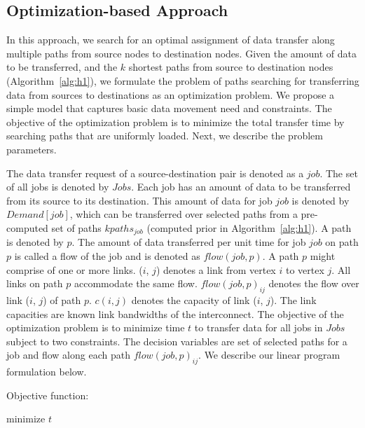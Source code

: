 \subsection{Optimization-based Approach}
\label{sec:optimization}

In this approach, we search for an optimal assignment of data transfer along multiple paths from source nodes to destination nodes. Given the amount of data to be transferred, and the $k$ shortest paths from source to destination nodes (Algorithm~\ref{alg:h1}), we formulate the problem of paths searching for transferring data from sources to destinations as an optimization problem. We propose a simple model that captures basic data movement need and constraints. The objective of the optimization problem is to minimize the total transfer time by searching paths that are uniformly loaded. Next, we describe the problem parameters.

The data transfer request of a source-destination pair is denoted as a $job$. The set of all jobs is denoted by $Jobs$. Each job has an amount of data to be transferred from its source to its destination. This amount of data for job $job$ is denoted by $Demand[job]$, which can be transferred over selected paths from a pre-computed set of paths $kpaths_{job}$ (computed prior in Algorithm~\ref{alg:h1}). A path is denoted by $p$. The amount of data transferred per unit time for job $job$ on path $p$ is called a flow of the job and is denoted as $flow(job, p)$. A path $p$ might comprise of one or more links. ($i$, $j$) denotes a link from vertex $i$ to vertex $j$. All links on path $p$ accommodate the same flow. $flow(job, p)_{ij}$ denotes the flow over link ($i$, $j$) of path $p$. $c(i,j)$ denotes the capacity of link ($i$, $j$). The link capacities are known link bandwidths of the interconnect. The objective of the optimization problem is to minimize time $t$ to transfer data for all jobs in $Jobs$ subject to two constraints. The decision variables are set of selected paths for a job and flow along each path $flow(job, p)_{ij}$. We describe our linear program formulation below.

Objective function:

\begin{center}
minimize $t$
\end{center}

